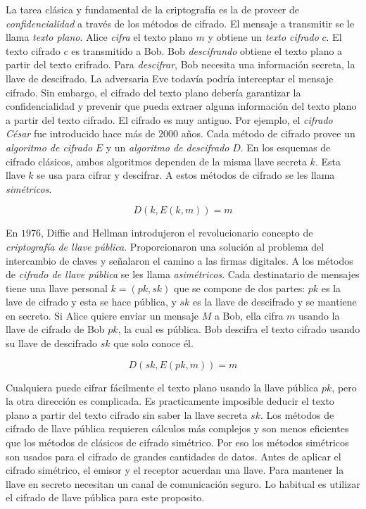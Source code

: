 \documentclass[12pt]{article}
\theoremstyle{definition}
\begin{document}
La tarea clásica y fundamental de la criptografía es la de proveer de \textit{confidencialidad} a través de los métodos de cifrado. El mensaje a transmitir se le llama \textit{texto plano}. Alice \textit{cifra} el texto plano $m$ y obtiene un \textit{texto cifrado} $c$. El texto cifrado $c$ es transmitido a Bob. Bob \textit{descifrando} obtiene el texto plano a partir del texto crifrado. Para \textit{descifrar}, Bob necesita una información secreta, la llave de descifrado. La adversaria Eve todavía podría interceptar el mensaje cifrado. Sin embargo, el cifrado del texto plano debería garantizar la confidencialidad y prevenir que pueda extraer alguna información del texto plano a partir del texto cifrado.
\newline
\newline
El cifrado es muy antiguo. Por ejemplo, el \textit{cifrado César} fue introducido hace más de $2000$ años. Cada método de cifrado provee un \textit{algoritmo de cifrado} $E$ y un \textit{algoritmo de descifrado} $D$. En los esquemas de cifrado clásicos, ambos algoritmos dependen de la misma llave secreta $k$. Esta llave $k$ se usa para cifrar y descifrar. A estos métodos de cifrado se les llama \textit{simétricos}.

$$D(k,E(k,m))=m$$

En $1976$, Diffie and Hellman introdujeron el revolucionario concepto de \textit{criptografía de llave pública}. Proporcionaron una solución al problema del intercambio de claves y señalaron el camino a las firmas digitales. A los métodos de \textit{cifrado de llave pública} se les llama \textit{asimétricos}. Cada destinatario de mensajes tiene una llave personal $k = (pk,sk)$ que se compone de dos partes: $pk$ es la lave de cifrado y esta se hace pública, y $sk$ es la llave de descifrado y se mantiene en secreto. Si Alice quiere enviar un mensaje $M$ a Bob, ella cifra $m$ usando la llave de cifrado de Bob $pk$, la cual es pública. Bob descifra el texto cifrado usando su llave de descifrado $sk$ que solo conoce él.

$$D(sk,E(pk,m))=m$$

Cualquiera puede cifrar fácilmente el texto plano usando la llave pública $pk$, pero la otra dirección es complicada. Es practicamente imposible deducir el texto plano a partir del texto cifrado sin saber la llave secreta $sk$.
\newline
\newline
Los métodos de cifrado de llave pública requieren cálculos más complejos y son menos eficientes que los métodos de clásicos de cifrado simétrico. Por eso los métodos simétricos son usados para el cifrado de grandes cantidades de datos. Antes de aplicar el cifrado simétrico, el emisor y el receptor acuerdan una llave. Para mantener la llave en secreto necesitan un canal de comunicación seguro. Lo habitual es utilizar el cifrado de llave pública para este proposito.
\end{document}

